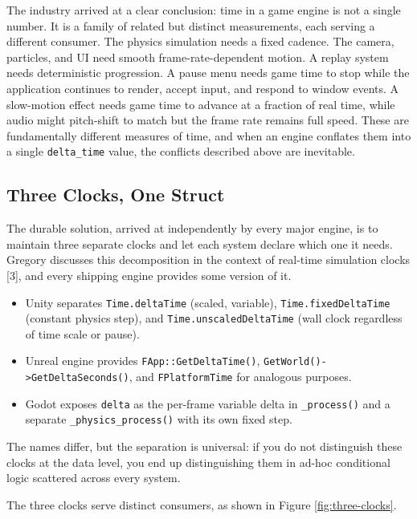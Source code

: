 \documentclass[
  11pt,
  letterpaper,
  DIV=11,
  numbers=noendperiod,
  twoside,
  open=right]{scrreprt}
\begin{document}
The industry arrived at a clear conclusion: time in a game engine is not
a single number. It is a family of related but distinct measurements,
each serving a different consumer. The physics simulation needs a fixed
cadence. The camera, particles, and UI need smooth frame-rate-dependent
motion. A replay system needs deterministic progression. A pause menu
needs game time to stop while the application continues to render,
accept input, and respond to window events. A slow-motion effect needs
game time to advance at a fraction of real time, while audio might
pitch-shift to match but the frame rate remains full speed. These are
fundamentally different measures of time, and when an engine conflates
them into a single \texttt{delta\_time} value, the conflicts described
above are inevitable.

\subsection{Three Clocks, One Struct}\label{three-clocks-one-struct}

The durable solution, arrived at independently by every major engine, is
to maintain three separate clocks and let each system declare which one
it needs. Gregory discusses this decomposition in the context of
real-time simulation clocks {[}3{]}, and every shipping engine provides
some version of it.

\begin{itemize}
\item
  Unity separates \texttt{Time.deltaTime} (scaled, variable),
  \texttt{Time.fixedDeltaTime} (constant physics step), and
  \texttt{Time.unscaledDeltaTime} (wall clock regardless of time scale
  or pause).
\item
  Unreal engine provides \texttt{FApp::GetDeltaTime()},
  \texttt{GetWorld()-\textgreater{}GetDeltaSeconds()}, and
  \texttt{FPlatformTime} for analogous purposes.
\item
  Godot exposes \texttt{delta} as the per-frame variable delta in
  \texttt{\_process()} and a separate \texttt{\_physics\_process()} with
  its own fixed step.
\end{itemize}

The names differ, but the separation is universal: if you do not
distinguish these clocks at the data level, you end up distinguishing
them in ad-hoc conditional logic scattered across every system.

The three clocks serve distinct consumers, as shown in Figure
\ref{fig:three-clocks}.
\end{document}
